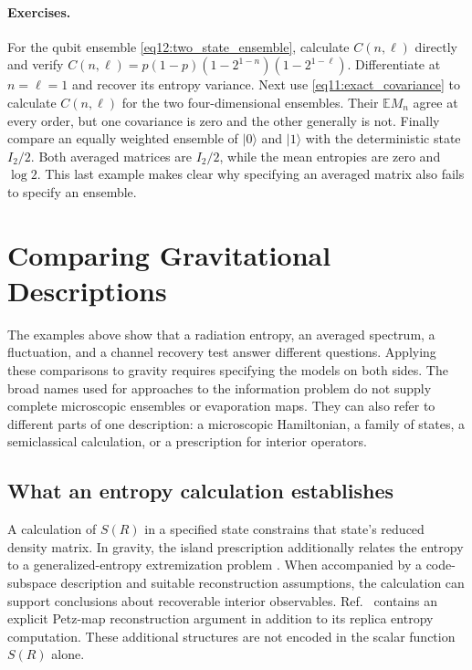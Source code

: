 \documentclass[11pt,letterpaper]{article}
\theoremstyle{plain}
\theoremstyle{definition}
\theoremstyle{remark}
\newcommand{\E}{\mathbb{E}}
\begin{document}
\paragraph{Exercises.}
For the qubit ensemble \eqref{eq12:two_state_ensemble}, calculate
$C(n,\ell)$ directly and verify
$C(n,\ell)=p(1-p)(1-2^{1-n})(1-2^{1-\ell})$.
Differentiate at $n=\ell=1$ and recover its entropy variance. Next use
\eqref{eq11:exact_covariance} to calculate $C(n,\ell)$ for the two
four-dimensional ensembles. Their $\E M_n$ agree at every order, but
one covariance is zero and the other generally is not. Finally compare
an equally weighted ensemble of $|0\rangle$ and $|1\rangle$ with the
deterministic state $I_2/2$. Both averaged matrices are $I_2/2$, while
the mean entropies are zero and $\log2$. This last example makes clear
why specifying an averaged matrix also fails to specify an ensemble.

\section{Comparing Gravitational Descriptions}
\label{sec13:discriminating_proposals}

The examples above show that a radiation entropy, an averaged spectrum,
a fluctuation, and a channel recovery test answer different questions.
Applying these comparisons to gravity requires specifying the models
on both sides. The broad names used for approaches to the information
problem do not supply complete microscopic ensembles or evaporation
maps. They can also refer to different parts of one description:
a microscopic Hamiltonian, a family of states, a semiclassical
calculation, or a prescription for interior operators.

\subsection{What an entropy calculation establishes}

A calculation of $S(R)$ in a specified state constrains that state's
reduced density matrix. In gravity, the island prescription additionally
relates the entropy to a generalized-entropy extremization problem
\cite{engelhardtwall2015,penington2020,almheirietal2019}.
When accompanied by a code-subspace description and suitable
reconstruction assumptions, the calculation can support conclusions
about recoverable interior observables. Ref.~\cite{pssyetal2022}
contains an explicit Petz-map reconstruction argument in addition to
its replica entropy computation. These additional structures are not
encoded in the scalar function $S(R)$ alone.
\end{document}
